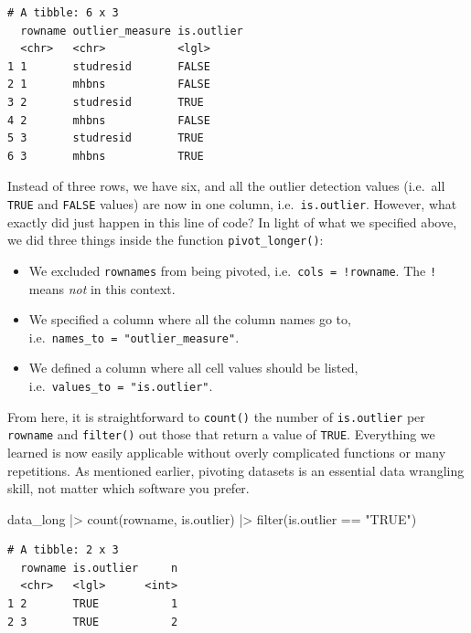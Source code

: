 \documentclass[
  letterpaper,
  DIV=11,
  numbers=noendperiod]{scrreprt}
\newenvironment{Shaded}{\begin{snugshade}}{\end{snugshade}}
\newcommand{\FunctionTok}[1]{\textcolor[rgb]{0.28,0.35,0.67}{#1}}
\newcommand{\NormalTok}[1]{\textcolor[rgb]{0.00,0.23,0.31}{#1}}
\newcommand{\SpecialCharTok}[1]{\textcolor[rgb]{0.37,0.37,0.37}{#1}}
\newcommand{\StringTok}[1]{\textcolor[rgb]{0.13,0.47,0.30}{#1}}
\begin{document}
\begin{verbatim}
# A tibble: 6 x 3
  rowname outlier_measure is.outlier
  <chr>   <chr>           <lgl>     
1 1       studresid       FALSE     
2 1       mhbns           FALSE     
3 2       studresid       TRUE      
4 2       mhbns           FALSE     
5 3       studresid       TRUE      
6 3       mhbns           TRUE      
\end{verbatim}

Instead of three rows, we have six, and all the outlier detection values
(i.e.~all \texttt{TRUE} and \texttt{FALSE} values) are now in one
column, i.e.~\texttt{is.outlier}. However, what exactly did just happen
in this line of code? In light of what we specified above, we did three
things inside the function \texttt{pivot\_longer()}:

\begin{itemize}
\item
  We excluded \texttt{rownames} from being pivoted,
  i.e.~\texttt{cols\ =\ !rowname}. The \texttt{!} means \emph{not} in
  this context.
\item
  We specified a column where all the column names go to,
  i.e.~\texttt{names\_to\ =\ "outlier\_measure"}.
\item
  We defined a column where all cell values should be listed,
  i.e.~\texttt{values\_to\ =\ "is.outlier"}.
\end{itemize}

From here, it is straightforward to \texttt{count()} the number of
\texttt{is.outlier} per \texttt{rowname} and \texttt{filter()} out those
that return a value of \texttt{TRUE}. Everything we learned is now
easily applicable without overly complicated functions or many
repetitions. As mentioned earlier, pivoting datasets is an essential
data wrangling skill, not matter which software you prefer.

\begin{Shaded}
\begin{Highlighting}[]
\NormalTok{data\_long }\SpecialCharTok{|\textgreater{}}
  \FunctionTok{count}\NormalTok{(rowname, is.outlier) }\SpecialCharTok{|\textgreater{}}
  \FunctionTok{filter}\NormalTok{(is.outlier }\SpecialCharTok{==} \StringTok{"TRUE"}\NormalTok{)}
\end{Highlighting}
\end{Shaded}

\begin{verbatim}
# A tibble: 2 x 3
  rowname is.outlier     n
  <chr>   <lgl>      <int>
1 2       TRUE           1
2 3       TRUE           2
\end{verbatim}
\end{document}
